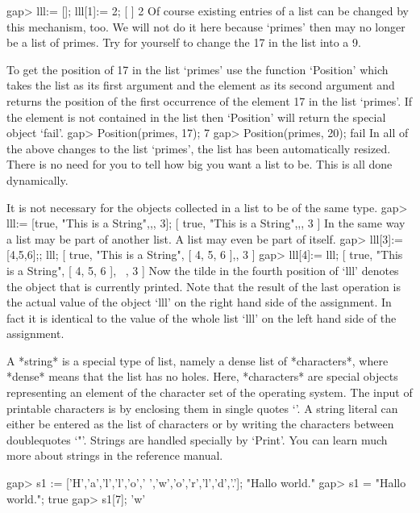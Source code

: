 \endexample

\beginexample
gap> lll:= []; lll[1]:= 2;
[  ]
2
\endexample
Of course  existing entries of a list  can be  changed by this mechanism,
too. We will not do it here because `primes' then may no longer be a list
of primes. Try for yourself to change the 17 in the list into a 9.

To get the position    of 17 in  the   list  `primes' use   the  function
`Position' which takes the list as its  first argument and the element as
its second argument  and returns the position of  the first occurrence of
the element 17 in the list `primes'.
If the element is not contained in the list then `Position' will return
the special object `fail'.
\beginexample
gap> Position(primes, 17);
7
gap> Position(primes, 20);
fail
\endexample
In  all  of the  above changes to  the  list `primes',  the list has been
automatically resized.  There  is no need  for you to tell {\GAP} how big
you want a list to be.  This is all done dynamically.

It is not necessary for the objects collected in a list to be of the same
type.
\beginexample
gap> lll:= [true, "This is a String",,, 3];
[ true, "This is a String",,, 3 ]
\endexample
In the same way a list may be part of another  list.  A list  may even be
part of itself.
\beginexample
gap> lll[3]:= [4,5,6];; lll;
[ true, "This is a String", [ 4, 5, 6 ],, 3 ]
gap> lll[4]:= lll;
[ true, "This is a String", [ 4, 5, 6 ], ~, 3 ]
\endexample
Now the tilde in the fourth position of `lll'  denotes the object that is
currently  printed. Note that  the result  of the  last operation is  the
actual value  of  the  object  `lll'   on  the  right  hand side  of  the
assignment. In  fact it is  identical to the value  of the whole list
`lll' on the left hand side of the assignment.

A *string*  is a  special type  of list,
namely a dense  list of *characters*, where *dense* means  that the list has
no  holes. Here,  *characters* are  special {\GAP}  objects representing  an
element of the character set of the operating system. The input of printable
characters is  by enclosing them in  single quotes `\pif'. A  string literal
can either be entered as the list of characters or by writing the characters
between doublequotes `"'. Strings are  handled specially by `Print'. You can
learn much more about strings in the reference manual.

\beginexample
gap> s1 := ['H','a','l','l','o',' ','w','o','r','l','d','.'];
"Hallo world."
gap> s1 = "Hallo world.";
true
gap> s1[7];
'w'
\endexample

